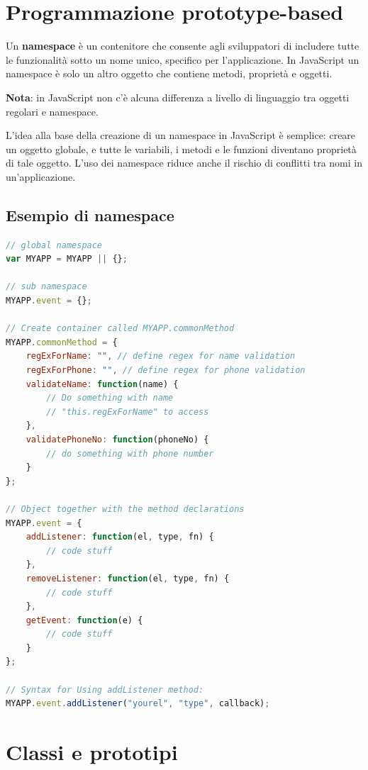 \section{Programmazione prototype-based}

Un \textbf{namespace} è un contenitore che consente agli sviluppatori di includere tutte le funzionalità sotto un nome unico, specifico per l'applicazione. In JavaScript un namespace è solo un altro oggetto che contiene metodi, proprietà e oggetti.

\textbf{Nota}: in JavaScript non c'è alcuna differenza a livello di linguaggio tra oggetti regolari e namespace.

L'idea alla base della creazione di un namespace in JavaScript è semplice: creare un oggetto globale, e tutte le variabili, i metodi e le funzioni diventano proprietà di tale oggetto. L'uso dei namespace riduce anche il rischio di conflitti tra nomi in un'applicazione.

\subsection{Esempio di namespace}

\begin{lstlisting}[language=JavaScript]
// global namespace
var MYAPP = MYAPP || {};

// sub namespace
MYAPP.event = {};

// Create container called MYAPP.commonMethod
MYAPP.commonMethod = {
    regExForName: "", // define regex for name validation
    regExForPhone: "", // define regex for phone validation
    validateName: function(name) {
        // Do something with name
        // "this.regExForName" to access
    },
    validatePhoneNo: function(phoneNo) {
        // do something with phone number
    }
};

// Object together with the method declarations
MYAPP.event = {
    addListener: function(el, type, fn) {
        // code stuff
    },
    removeListener: function(el, type, fn) {
        // code stuff
    },
    getEvent: function(e) {
        // code stuff
    }
};

// Syntax for Using addListener method:
MYAPP.event.addListener("yourel", "type", callback);
\end{lstlisting}

\section{Classi e prototipi}


